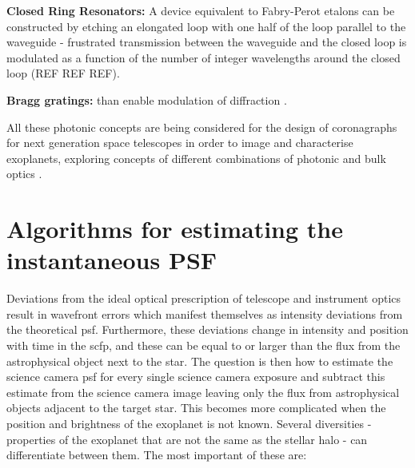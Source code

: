 \documentclass[letterpaper]{ar-1col}
\begin{document}
{\bf Closed Ring Resonators: } A device equivalent to Fabry-Perot etalons can be constructed by etching an elongated loop with one half of the loop parallel to the waveguide - frustrated transmission between the waveguide and the closed loop is modulated as a function of the number of integer wavelengths around the closed loop (REF REF REF).

{\bf Bragg gratings: } than enable modulation of diffraction \citep{FaggingerAuer24}.

All these photonic concepts are being considered for the design of coronagraphs for next generation space telescopes in order to image and characterise exoplanets, exploring concepts of different combinations of photonic and bulk optics \citep{Desai23a}.

%


%
%
 


\section{Algorithms for estimating the instantaneous PSF}


Deviations from the ideal optical prescription of telescope and instrument optics result in wavefront errors which manifest themselves as intensity deviations from the theoretical \ac{psf}.
%
Furthermore, these deviations change in intensity and position with time in the \ac{scfp}, and these can be equal to or larger than the flux from the astrophysical object next to the star.
%
The question is then how to estimate the science camera \ac{psf} for every single science camera exposure  and subtract this estimate from the science camera image leaving only the flux from astrophysical objects adjacent to the target star.
%
This becomes more complicated when the position and brightness of the exoplanet is not known.
%
%
Several diversities - properties of the exoplanet that are not the same as the stellar halo - can differentiate between them.
%
The most important of these are:
\end{document}
